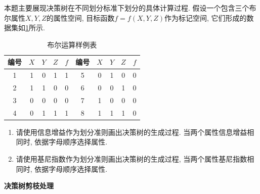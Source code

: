 \documentclass[answers]{exam}  %
\begin{document}
\begin{questions}
  本题主要展现决策树在不同划分标准下划分的具体计算过程. 假设一个包含三个布尔属性$X, Y, Z$的属性空间, 目标函数$f=f(X, Y, Z)$作为标记空间, 它们形成的数据集如\ref{ch4_tab:bool_table}所示.
  \begin{table}[ht]
    \centering
    \caption{布尔运算样例表}\label{ch4_tab:bool_table}
    \tabcolsep 15pt
    \begin{tabular}{cccc|c||cccc|c}
      \hline
      编号     & $X$ & $Y$ & $Z$ & $f$ & 编号 & $X$ & $Y$ & $Z$ & $f$ \\
      \hline 1 & 1   & 0   & 1   & 1   & 5    & 0   & 1   & 0   & 0   \\
      2        & 1   & 1   & 0   & 0   & 6    & 0   & 0   & 1   & 0   \\
      3        & 0   & 0   & 0   & 0   & 7    & 1   & 0   & 0   & 0   \\
      4        & 0   & 1   & 1   & 1   & 8    & 1   & 1   & 1   & 0   \\
      \hline
    \end{tabular}
  \end{table}
  \begin{enumerate}
    \item 请使用信息增益作为划分准则画出决策树的生成过程. 当两个属性信息增益相同时, 依据字母顺序选择属性.
    \item 请使用基尼指数作为划分准则画出决策树的生成过程, 当两个属性基尼指数相同时, 依据字母顺序选择属性.
  \end{enumerate}

  \begin{solution}
  \end{solution}


  \question [25] \textbf{决策树剪枝处理} \label{ch4_prob:prunning}


\end{questions}
\end{document}
